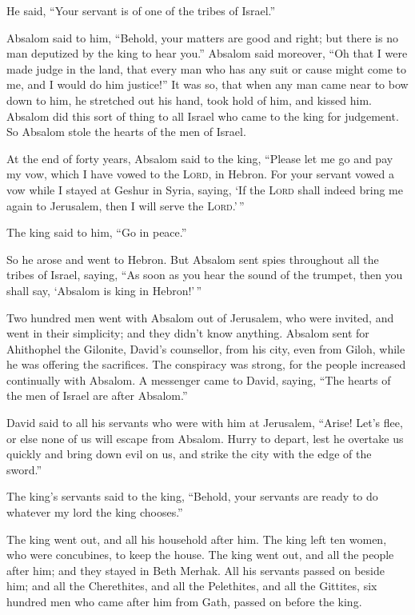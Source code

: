 He said, ``Your servant is of one of the tribes of Israel.''

 Absalom said to him, ``Behold, your matters are good and
right; but there is no man deputized by the king to hear you.''
 Absalom said moreover, ``Oh that I were made judge in the
land, that every man who has any suit or cause might come to me, and I
would do him justice!''  It was so, that when any man came
near to bow down to him, he stretched out his hand, took hold of him,
and kissed him.  Absalom did this sort of thing to all
Israel who came to the king for judgement. So Absalom stole the hearts
of the men of Israel.

 At the end of forty years, Absalom said to the king,
``Please let me go and pay my vow, which I have vowed to the
\textsc{Lord}, in Hebron.  For your servant vowed a vow
while I stayed at Geshur in Syria, saying, `If the \textsc{Lord} shall
indeed bring me again to Jerusalem, then I will serve the
\textsc{Lord}.'\,''

 The king said to him, ``Go in peace.''

So he arose and went to Hebron.  But Absalom sent spies
throughout all the tribes of Israel, saying, ``As soon as you hear the
sound of the trumpet, then you shall say, `Absalom is king in
Hebron!'\,''

 Two hundred men went with Absalom out of Jerusalem, who
were invited, and went in their simplicity; and they didn't know
anything.  Absalom sent for Ahithophel the Gilonite,
David's counsellor, from his city, even from Giloh, while he was
offering the sacrifices. The conspiracy was strong, for the people
increased continually with Absalom.  A messenger came to
David, saying, ``The hearts of the men of Israel are after Absalom.''

 David said to all his servants who were with him at
Jerusalem, ``Arise! Let's flee, or else none of us will escape from
Absalom. Hurry to depart, lest he overtake us quickly and bring down
evil on us, and strike the city with the edge of the sword.''

 The king's servants said to the king, ``Behold, your
servants are ready to do whatever my lord the king chooses.''

 The king went out, and all his household after him. The
king left ten women, who were concubines, to keep the house.
 The king went out, and all the people after him; and
they stayed in Beth Merhak.  All his servants passed on
beside him; and all the Cherethites, and all the Pelethites, and all the
Gittites, six hundred men who came after him from Gath, passed on before
the king.

